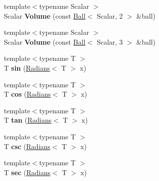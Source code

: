 \begin{DoxyCompactItemize}
\item 
\hypertarget{namespace_d_r_d_s_p_ac641b0bfae8c2be9d3f0573c15fb1a4b}{{\footnotesize template$<$typename Scalar $>$ }\\Scalar {\bfseries Volume} (const \hyperlink{struct_d_r_d_s_p_1_1_ball}{Ball}$<$ Scalar, 2 $>$ \&ball)}\label{namespace_d_r_d_s_p_ac641b0bfae8c2be9d3f0573c15fb1a4b}

\item 
\hypertarget{namespace_d_r_d_s_p_a65f0f6c65a16277e343a1f7444caf03b}{{\footnotesize template$<$typename Scalar $>$ }\\Scalar {\bfseries Volume} (const \hyperlink{struct_d_r_d_s_p_1_1_ball}{Ball}$<$ Scalar, 3 $>$ \&ball)}\label{namespace_d_r_d_s_p_a65f0f6c65a16277e343a1f7444caf03b}

\item 
\hypertarget{namespace_d_r_d_s_p_a69381ef92f19ad7e7597a0a37f6bc2f9}{{\footnotesize template$<$typename T $>$ }\\T {\bfseries sin} (\hyperlink{struct_d_r_d_s_p_1_1_radians}{Radians}$<$ T $>$ x)}\label{namespace_d_r_d_s_p_a69381ef92f19ad7e7597a0a37f6bc2f9}

\item 
\hypertarget{namespace_d_r_d_s_p_a9630e9f106d4a87cad11312c40d94dcc}{{\footnotesize template$<$typename T $>$ }\\T {\bfseries cos} (\hyperlink{struct_d_r_d_s_p_1_1_radians}{Radians}$<$ T $>$ x)}\label{namespace_d_r_d_s_p_a9630e9f106d4a87cad11312c40d94dcc}

\item 
\hypertarget{namespace_d_r_d_s_p_a5073408fbc6114e09a8e2f957d9a4fdb}{{\footnotesize template$<$typename T $>$ }\\T {\bfseries tan} (\hyperlink{struct_d_r_d_s_p_1_1_radians}{Radians}$<$ T $>$ x)}\label{namespace_d_r_d_s_p_a5073408fbc6114e09a8e2f957d9a4fdb}

\item 
\hypertarget{namespace_d_r_d_s_p_ab1084f795bfc300b881223bed0c77daa}{{\footnotesize template$<$typename T $>$ }\\T {\bfseries csc} (\hyperlink{struct_d_r_d_s_p_1_1_radians}{Radians}$<$ T $>$ x)}\label{namespace_d_r_d_s_p_ab1084f795bfc300b881223bed0c77daa}

\item 
\hypertarget{namespace_d_r_d_s_p_af1c168280cdb7bd4d837928016c7a931}{{\footnotesize template$<$typename T $>$ }\\T {\bfseries sec} (\hyperlink{struct_d_r_d_s_p_1_1_radians}{Radians}$<$ T $>$ x)}\label{namespace_d_r_d_s_p_af1c168280cdb7bd4d837928016c7a931}


\end{DoxyCompactItemize}
